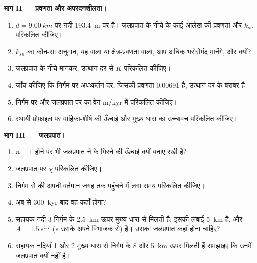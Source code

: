 \begin{problem}
\medskip\noindent\textbf{भाग II --- प्रवणता और अपरदनशीलता।}
\begin{enumerate}[resume]
\item $d = \qty{9.00}{km}$ पर नदी \qty{193.4}{m} पर है। जलप्रपात के नीचे के
  काई आलेख की प्रवणता और  $k_{sn}$ परिकलित कीजिए।
\item $k_{sn}$ का कौन-सा अनुमान, यह वाला या क्षेत्र-प्रवणता वाला, आप अधिक भरोसेमंद मानेंगे,
  और क्यों?
\item जलप्रपात के नीचे  मानकर, उत्थान दर से $K$
  परिकलित कीजिए।
\item जाँच कीजिए कि निर्गम पर अधःकर्तन दर, जिसकी प्रवणता
  0.00691 है, उत्थान दर के बराबर है।
\item निर्गम पर और जलप्रपात पर  का वेग
  m/kyr में परिकलित कीजिए।
\item स्थायी प्रोफ़ाइल पर वाहिका-शीर्ष की ऊँचाई
  और मुख्य धारा का उच्चावच परिकलित कीजिए।
\end{enumerate}

\medskip\noindent\textbf{भाग III --- जलप्रपात।}
\begin{enumerate}[resume]
\item $n = 1$ होने पर भी जलप्रपात ने  के गिरने की ऊँचाई
  क्यों बनाए रखी है?
\item जलप्रपात पर $\chi$ परिकलित कीजिए।
\item निर्गम से  की अपनी वर्तमान जगह तक पहुँचने में लगा समय
  परिकलित कीजिए।
\item अब से \qty{300}{kyr} बाद वह कहाँ होगा?
\item सहायक नदी 3 निर्गम के \qty{2.5}{km} ऊपर मुख्य धारा से मिलती है; इसकी
  लंबाई \qty{5}{km} है, और $A = 1.5\,s^{1.7}$ ($s$ उसके अपने विभाजक से) है।
  उसका जलप्रपात कहाँ होना चाहिए?
\item सहायक नदियाँ 1 और 2 मुख्य धारा से निर्गम के 8 और \qty{5}{km} ऊपर मिलती हैं
  समझाइए कि उनमें जलप्रपात क्यों नहीं है।
\end{enumerate}


\end{problem}
